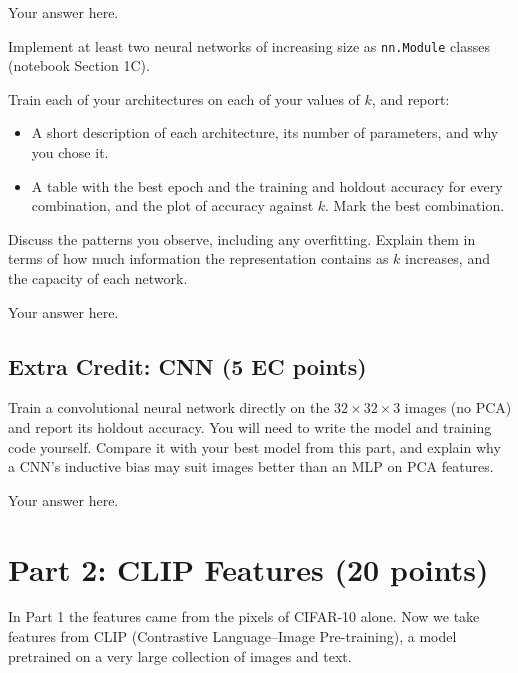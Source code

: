 \begin{solution}
Your answer here.
\end{solution}

\begin{question}[5]
Implement at least two neural networks of increasing size as \texttt{nn.Module}
classes (notebook Section 1C).
\end{question}

\begin{question}[10]
Train each of your architectures on each of your values of $k$, and report:
\begin{itemize}
  \item A short description of each architecture, its number of parameters, and why you
    chose it.
  \item A table with the best epoch and the training and holdout accuracy for every
    combination, and the plot of accuracy against $k$. Mark the best combination.
\end{itemize}
Discuss the patterns you observe, including any overfitting. Explain them in terms of how
much information the representation contains as $k$ increases, and the capacity of each
network.
\end{question}

\begin{solution}
Your answer here.
\end{solution}

\subsection{Extra Credit: CNN (5 EC points)}

Train a convolutional neural network directly on the $32 \times 32 \times 3$ images (no
PCA) and report its holdout accuracy. You will need to write the model and training code
yourself. Compare it with your best model from this part, and explain why a CNN's
inductive bias may suit images better than an MLP on PCA features.

\begin{ecsolution}
Your answer here.
\end{ecsolution}

\section{Part 2: CLIP Features (20 points)}

In Part 1 the features came from the pixels of CIFAR-10 alone. Now we take features from
CLIP (Contrastive Language--Image Pre-training), a model pretrained on a very large
collection of images and text.


